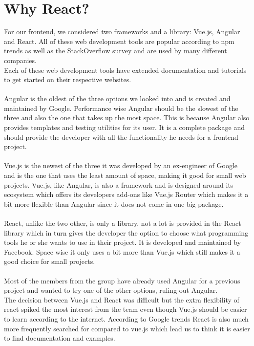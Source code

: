 \section{Why React?}
For our frontend, we considered two frameworks and a library: Vue.js, Angular and React.
All of these web development tools are popular according to npm trends as well as the StackOverflow survey and are used by many different companies\cite{VueReactAngular}.
\\
Each of these web development tools have extended documentation and tutorials to get started on their respective websites.
\\\\
Angular is the oldest of the three options we looked into and is created and maintained by Google\cite{AngularHistory}.
Performance wise Angular should be the slowest of the three and also the one that takes up the most space\cite{VueReactAngular}.
This is because Angular also provides templates and testing utilities for its user.
It is a complete package and should provide the developer with all the functionality he needs for a frontend project.
\\\\
Vue.js is the newest of the three it was developed by an ex-engineer of Google and is the one that uses the least amount of space, making it good for small web projects\cite{ComparisonWithOtherFrameworks}.
Vue.js, like Angular, is also a framework and is designed around its ecosystem which offers its developers add-ons like Vue.js Router which makes it a bit more flexible than Angular since it does not come in one big package.
\\\\
React, unlike the two other, is only a library\cite{ReactJS}, not a lot is provided in the React library which in turn gives the developer the option to choose what programming tools he or she wants to use in their project.
It is developed and maintained by Facebook\cite{ReactHistory}.
Space wise it only uses a bit more than Vue.js which still makes it a good choice for small projects.
\\\\
Most of the members from the group have already used Angular for a previous project and wanted to try one of the other options, ruling out Angular. 
\\
The decision between Vue.js and React was difficult but the extra flexibility of react spiked the most interest from the team even though Vue.js should be easier to learn according to the internet\cite{ComparisonWithOtherFrameworks}.
According to Google trends React is also much more frequently searched for compared to vue.js which lead us to think it is easier to find documentation and examples.

